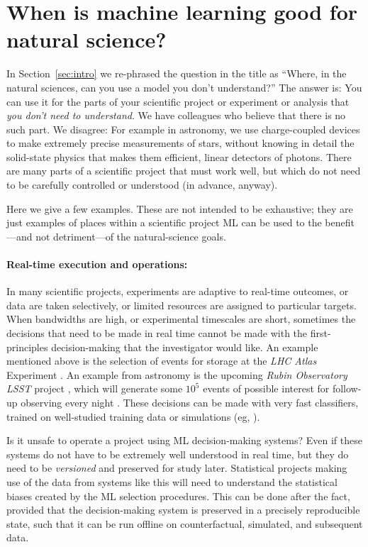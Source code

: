 \documentclass[10pt]{article}
\newcommand{\sectionname}{Section}
\newcommand{\secref}[1]{\sectionname~\ref{#1}}
\begin{document}
\section{When is machine learning good for natural science?}\label{sec:good}
In \secref{sec:intro} we re-phrased the question in the title as
``Where, in the natural sciences, can you use a model you don't understand?''
The answer is: You can use it for the parts of your scientific project or experiment or analysis that \emph{you don't need to understand}.
We have colleagues who believe that there is no such part.
We disagree: For example in astronomy, we use charge-coupled devices to make extremely precise measurements of stars, without knowing in detail the solid-state physics that makes them efficient, linear detectors of photons.
There are many parts of a scientific project that must work well, but which do not need to be carefully controlled or understood (in advance, anyway).

Here we give a few examples.
These are not intended to be exhaustive; they are just examples of places within a scientific project ML can be used to the benefit---and not detriment---of the natural-science goals.

\paragraph{Real-time execution and operations:}
In many scientific projects, experiments are adaptive to real-time outcomes, or data are taken selectively, or limited resources are assigned to particular targets.
When bandwidths are high, or experimental timescales are short, sometimes the decisions that need to be made in real time cannot be made with the first-principles decision-making that the investigator would like.
An example mentioned above is the selection of events for storage at the \textsl{LHC Atlas} Experiment \cite{atlas}.
An example from astronomy is the upcoming \textsl{Rubin Observatory LSST} project \cite{rubin}, which will generate some $10^5$ events of possible interest for follow-up observing every night \cite{lsst_events}.
These decisions can be made with very fast classifiers, trained on well-studied training data or simulations (eg, \citealt{lsst_broker}).

Is it unsafe to operate a project using ML decision-making systems?
Even if these systems do not have to be extremely well understood in real time, but they do need to be \emph{versioned} and preserved for study later.
Statistical projects making use of the data from systems like this will need to understand the statistical biases created by the ML selection procedures.
This can be done after the fact, provided that the decision-making system is preserved in a precisely reproducible state, such that it can be run offline on counterfactual, simulated, and subsequent data.
\end{document}

